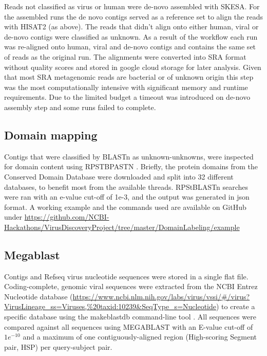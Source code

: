   Reads not classified as virus or human were de-novo assembled with SKESA. For
  the assembled runs the de novo contigs served as a reference set to align the
  reads with HISAT2 (as above). The reads that didn't align onto either human,
  viral or de-novo contigs were classified as unknown. As a result of the
  workflow each run was re-aligned onto human, viral and de-novo contigs and
  contains the same set of reads as the original run. The alignments were
  converted into SRA format without quality scores and stored in google cloud
  storage for later analysis. Given that most SRA metagenomic reads are
  bacterial or of unknown origin this step was the most computationally
  intensive with significant memory and runtime requirements. Due to the
  limited budget a timeout was introduced on de-novo assembly step and some
  runs failed to complete.

  \subsection{Domain mapping}
  Contigs that were classified by BLASTn as unknown-unknowns, were inspected
  for domain content using RPSTBPASTN \cite{Camacho2009}. Briefly, the protein
  domains from the Conserved Domain Database \cite{Marchler-Bauer2017}  were
  downloaded and split into 32 different databases, to benefit most from the
  available threads. RPStBLASTn searches were ran with an e-value cut-off of
  1e-3, and the output was generated in json format. A working example and the
  commands used are available on GitHub under
  \url{https://github.com/NCBI-Hackathons/VirusDiscoveryProject/tree/master/DomainLabeling/example}

  \subsection{Megablast}
  Contigs and Refseq virus nucleotide sequences were stored in a single flat
  file. Coding-complete, genomic viral sequences were extracted from the NCBI
  Entrez Nucleotide database
  (\url{https://www.ncbi.nlm.nih.gov/labs/virus/vssi/#/virus?VirusLineage_ss=Viruses,%20taxid:10239&SeqType_s=Nucleotide})
  to create a specific database  using the makeblastdb command-line tool
  \cite{Camacho2009}. All sequences were compared against  all sequences using
  MEGABLAST \cite{Camacho2009} with an E-value cut-off of $1e^{-10}$ and a
  maximum of one contiguously-aligned region (High-scoring Segment pair, HSP)
  per query-subject pair.

